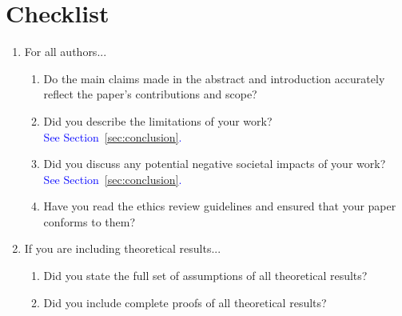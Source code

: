 \section*{Checklist}


\begin{enumerate}


\item For all authors...
\begin{enumerate}
  \item Do the main claims made in the abstract and introduction accurately reflect the paper's contributions and scope?
    \answerYes{}
  \item Did you describe the limitations of your work?
    \answerYes{}\\
    \textcolor{blue}{See Section~\ref{sec:conclusion}.}
  \item Did you discuss any potential negative societal impacts of your work?
    \answerYes{}\\
    \textcolor{blue}{See Section~\ref{sec:conclusion}.}
  \item Have you read the ethics review guidelines and ensured that your paper conforms to them?
    \answerYes{}
\end{enumerate}

\item If you are including theoretical results...
\begin{enumerate}
  \item Did you state the full set of assumptions of all theoretical results?
    \answerNA{}
	\item Did you include complete proofs of all theoretical results?
    \answerNA{}
\end{enumerate}


\end{enumerate}
